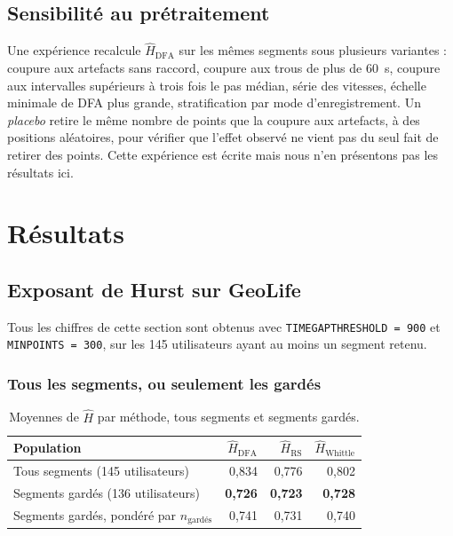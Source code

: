 \documentclass[11pt,a4paper]{article}
\newcommand{\code}[1]{\texttt{#1}}
\renewcommand{\_}{\textunderscore\penalty0\hspace{0pt}}
\begin{document}
\subsection{Sensibilité au prétraitement}

Une expérience recalcule $\hat H_{\mathrm{DFA}}$ sur les mêmes segments sous plusieurs
variantes : coupure aux artefacts sans raccord, coupure aux trous de plus de 60~s, coupure
aux intervalles supérieurs à trois fois le pas médian, série des vitesses, échelle minimale
de DFA plus grande, stratification par mode d'enregistrement. Un \emph{placebo} retire le
même nombre de points que la coupure aux artefacts, à des positions aléatoires, pour
vérifier que l'effet observé ne vient pas du seul fait de retirer des points. Cette
expérience est écrite mais nous n'en présentons pas les résultats ici.

\section{Résultats}
\label{sec:resultats}

\subsection{Exposant de Hurst sur GeoLife}
\label{sec:resultats-H}

Tous les chiffres de cette section sont obtenus avec \code{TIME\_GAP\_THRESHOLD = 900} et
\code{MIN\_POINTS = 300}, sur les 145 utilisateurs ayant au moins un segment retenu.

\subsubsection{Tous les segments, ou seulement les gardés}

\begin{table}[ht]
\centering
\caption{Moyennes de $\hat H$ par méthode, tous segments et segments gardés.}
\label{tab:moyennes-H}
\small
\begin{tabular}{lrrr}
\toprule
Population & $\hat H_{\mathrm{DFA}}$ & $\hat H_{\mathrm{RS}}$ & $\hat H_{\mathrm{Whittle}}$ \\
\midrule
Tous segments (145 utilisateurs) & 0{,}834 & 0{,}776 & 0{,}802 \\
Segments gardés (136 utilisateurs) & \textbf{0{,}726} & \textbf{0{,}723} & \textbf{0{,}728} \\
Segments gardés, pondéré par $n_{\text{gardés}}$ & 0{,}741 & 0{,}731 & 0{,}740 \\
\bottomrule
\end{tabular}
\end{table}
\end{document}
